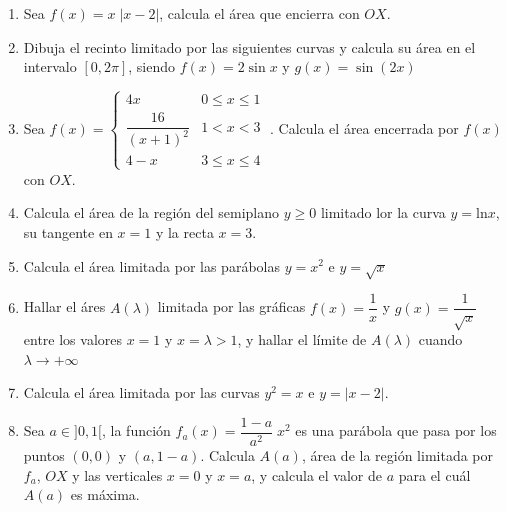\begin{enumerate}
\item Sea $f(x)=x\; |x-2|$, calcula el área que encierra con $OX$.

\rightline{\textcolor{gris}{Sol: $4/3 \; u^2$}}
 
 \item Dibuja el recinto limitado por las siguientes curvas y calcula su área en el intervalo $[0,2\pi]$, siendo $f(x)=2\sin x$ y $g(x)=\sin(2x)$
 
\rightline{\textcolor{gris}{Sol: $ 8\; u^2$}}

\item Sea $f(x)=\begin{cases}
4x & 0\le x \le 1 \\
\dfrac {16}{(x+1)^2} & 1<x<3 \\
4-x & 3\le x \le 4
\end{cases}\; $.  Calcula el área encerrada por $f(x)$ con $OX$.

\rightline{\textcolor{gris}{Sol: $ 13/2 \; u^2$}}

 
 \item Calcula el área de la región del semiplano $y\ge 0$ limitado lor la curva $y=\mathrm{ln}x$, su tangente en $x=1$ y la recta $x=3$.
 

\item Calcula el área limitada por las parábolas $y=x^2$ e $y=\sqrt{x}$

 \rightline{\textcolor{gris}{Sol: $ 1/3$}}
 
 \item Hallar el áres $A(\lambda)$ limitada por las gráficas $f(x)=\dfrac 1 x$ y $g(x)=\dfrac 1 {\sqrt{x}}$ entre los valores $x=1$ y $x=\lambda >1$, y hallar el límite de $A(\lambda)$ cuando $\lambda \to + \infty$

 
 \item Calcula el área limitada por las curvas $y^2=x$ e $y=|x-2|$.
  
 \rightline{\textcolor{gris}{Sol: $16/3\; u^2$}}
 
 \item Sea $a\in ]0,1[$, la función $f_a(x)=\dfrac {1-a}{a^2}\; x^2$ es una parábola que pasa por los puntos $(0,0)$ y $(a,1-a)$. Calcula $A(a)$, área de la región limitada por $f_a$, $OX$ y las verticales $x=0$ y $x=a$, y calcula el valor de $a$ para el cuál $A(a)$ es máxima.
 

\end{enumerate}
